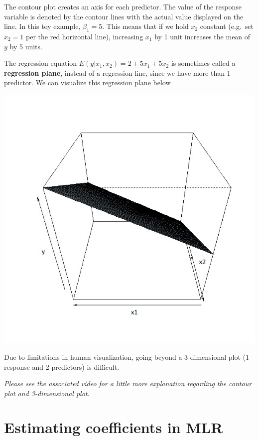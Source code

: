 \documentclass[
]{book}
\begin{document}
The contour plot creates an axis for each predictor. The value of the response variable is denoted by the contour lines with the actual value displayed on the line. In this toy example, \(\beta_1 = 5\). This means that if we hold \(x_2\) constant (e.g.~set \(x_2 = 1\) per the red horizontal line), increasing \(x_1\) by 1 unit increases the mean of \(y\) by 5 units.

The regression equation \(E(y|x_1,x_2) = 2 + 5x_1 + 5x_2\) is sometimes called a \textbf{regression plane}, instead of a regression line, since we have more than 1 predictor. We can visualize this regression plane below

\includegraphics{images/3dplot.jpg}

Due to limitations in human visualization, going beyond a 3-dimensional plot (1 response and 2 predictors) is difficult.

\emph{Please see the associated video for a little more explanation regarding the contour plot and 3-dimensional plot}.

\hypertarget{estimating-coefficients-in-mlr}{%
\section{Estimating coefficients in MLR}\label{estimating-coefficients-in-mlr}}
\end{document}
